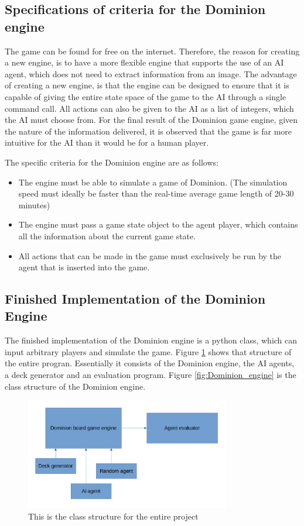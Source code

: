 \subsection{Specifications of criteria for the Dominion engine}
The game can be found for free on the internet. Therefore, the reason for creating a new engine, is to have a more flexible engine that supports the use of an AI agent, which does not need to extract information from an image. The advantage of creating a new engine, is that the engine can be designed to ensure that it is capable of giving the entire state space of the game to the AI through a single command call. All actions can also be given to the AI as a list of integers, which the AI must choose from. For the final result of the Dominion game engine, given the nature of the information delivered, it is observed that the game is far more intuitive for the AI than it would be for a human player.

The specific criteria for the Dominion engine are as follows:

\begin{itemize}
    \item The engine must be able to simulate a game of Dominion. (The simulation speed must ideally be faster than the real-time average game length of 20-30 minutes)
    \item The engine must pass a game state object to the agent player, which contains all the information about the current game state.
    \item All actions that can be made in the game must exclusively be run by the agent that is inserted into the game.
\end{itemize}

\subsection{Finished Implementation of the Dominion Engine} \label{sec:engine_implementation}
The finished implementation of the Dominion engine is a python class, which can input arbitrary players and simulate the game. Figure \ref{fig:program structure} shows that structure of the entire progran. Essentially it consists of the Dominion engine, the AI agents, a deck generator and an evaluation program. Figure \ref{fig:Dominion_engine} is the class structure of the Dominion engine. 
\begin{figure}[H]
    \centering
    \includegraphics[width=0.8\textwidth]{img/program_structure.png}
    \caption{This is the class structure for the entire project}
    \label{fig:program structure}
    
\end{figure}

